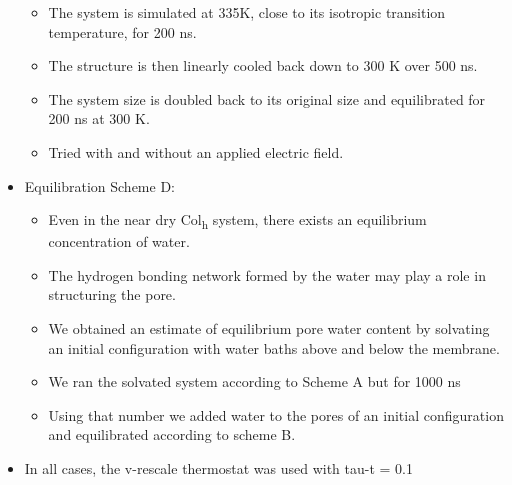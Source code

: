 \documentclass{article}
\begin{document}
\begin{itemize}
\begin{itemize}
          \item The system is simulated at 335K, close to its isotropic transition temperature, for 200 ns. %
          \item The structure is then linearly cooled back down to 300 K over 500 ns. 
          \item The system size is doubled back to its original size and equilibrated for 200 ns at 300 K.
          \item Tried with and without an applied electric field.
      \end{itemize}
      \item Equilibration Scheme D:
      \begin{itemize}
          \item Even in the near dry Col\textsubscript{h} system, there exists an
          equilibrium concentration of water.
          \item The hydrogen bonding network formed by the water may play a role 
          in structuring the pore.
          \item We obtained an estimate of equilibrium pore water content by solvating
          an initial configuration with water baths above and below the membrane. 
	  \item We ran the solvated system according to Scheme A but for 1000 ns
          \item Using that number we added water to the pores of an initial 
	  configuration and equilibrated according to scheme B. 
      \end{itemize}
      \item In all cases, the v-rescale thermostat was used with tau-t = 0.1
  \end{itemize}
\end{document}
